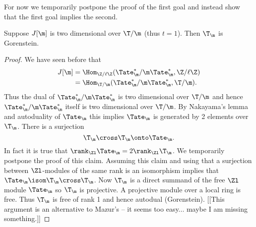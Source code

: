 \documentclass{report}
\begin{document}
For now we temporarily postpone the proof of the first goal and instead
show that the first goal implies the second.
\begin{theorem}
Suppose $J[\m]$ is two dimensional over $\T/\m$ (thus $t=1$). Then
$\T_\m$ is Gorenstein.
\end{theorem}
\begin{proof}
We have seen before that
\begin{align*}J[\m]&=\Hom_{\Z/\ell\Z}(\Tate^*_\m/\m\Tate^*_\m,\Z/\ell\Z)\\
                   &=\Hom_{\T/\m}(\Tate^*_\m/\m\Tate^*_\m,\T/\m).
\end{align*}
Thus the dual of $\Tate_\m^*/\m\Tate_\m^*$ is two dimensional over
$\T/\m$ and hence $\Tate_\m^*/\m\Tate_\m^*$ itself is two dimensional
over $\T/\m$. By Nakayama's lemma and autoduality of $\Tate_\m$
this implies $\Tate_\m$ is generated by 2 elements over $\T_\m$.
There is a surjection
$$\T_\m\cross\T_\m\onto\Tate_\m.$$
In fact it is true that $\rank_{\Zl}\Tate_\m=2\rank_{\Zl}\T_\m$. We
temporarily postpone the proof of this claim. Assuming this claim and
using that a surjection between $\Zl$-modules of the same rank
is an isomorphism implies that $\Tate_\m\isom\T_\m\cross\T_\m$.
Now $\T_\m$ is a direct summand of the free $\Zl$ module $\Tate_\m$
so $\T_\m$ is projective. A projective module over a local ring
is free. Thus $\T_\m$ is free of rank 1 and hence autodual (Gorenstein).
[[This argument is an alternative to Mazur's
-- it seems too easy... maybe I am missing something.]]


\end{proof}
\end{document}
